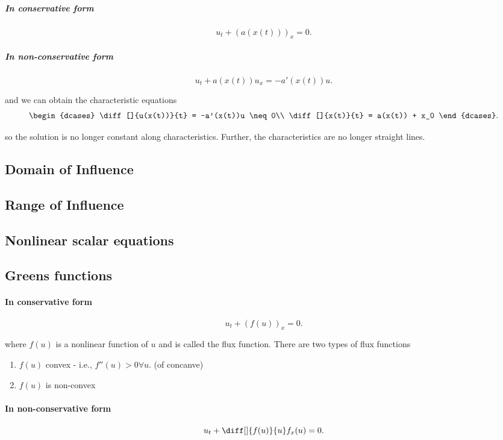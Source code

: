 \subparagraph{In conservative form}
\[
  u_{t}+ \left(a(x(t))\right)_{x} = 0
.\] 

\subparagraph{In non-conservative form}
\[
  u_{t}+a(x(t))u_{x} = -a'(x(t))u
.\] 

and we can obtain the characteristic equations
\[
  \begin{dcases}
  \diff[]{u(x(t))}{t} = -a'(x(t))u \neq 0\\
  \diff[]{x(t)}{t} = a(x(t)) + x_0
  \end{dcases}
.\] 

so the solution is no longer constant along characteristics. Further, the
characteristics are no longer straight lines.

\subsection{Domain of Influence}%

\subsection{Range of Influence}%

\subsection{Nonlinear scalar equations}%

\subsection{Greens functions}%


\paragraph{In conservative form}
\[
  u_{t}+ \left(f(u)\right)_{x} = 0
.\] 

where $f(u)$ is a nonlinear function of $u$ and is called the flux function.
There are two types of flux functions

\begin{enumerate}
  \item $f(u)$ convex - i.e., $f''(u)>0 \forall u$. (of concanve)
  \item $f(u)$ is non-convex
\end{enumerate}


\paragraph{In non-conservative form}
\[
  u_{t} + \diff[]{f(u)}{u}f_{x}(u) = 0
.\] 

